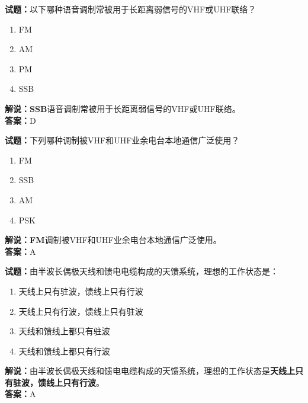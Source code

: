\documentclass{ctexbook}
\begin{document}
\vspace{\baselineskip}

\noindent\textbf{试题：}以下哪种语音调制常被用于长距离弱信号的VHF或UHF联络？

\begin{enumerate}[leftmargin=3em]
  \item FM
  \item AM
  \item PM
  \item SSB
\end{enumerate}

\noindent\textbf{解说：}\textbf{SSB}语音调制常被用于长距离弱信号的VHF或UHF联络。\\\noindent\textbf{答案：}D

\vspace{\baselineskip}

\noindent\textbf{试题：}下列哪种调制被VHF和UHF业余电台本地通信广泛使用？

\begin{enumerate}[leftmargin=3em]
  \item FM
  \item SSB
  \item AM
  \item PSK
\end{enumerate}

\noindent\textbf{解说：}\textbf{FM}调制被VHF和UHF业余电台本地通信广泛使用。\\\noindent\textbf{答案：}A

\vspace{\baselineskip}

\noindent\textbf{试题：}由半波长偶极天线和馈电电缆构成的天馈系统，理想的工作状态是：

\begin{enumerate}[leftmargin=3em]
  \item 天线上只有驻波，馈线上只有行波
  \item 天线上只有行波，馈线上只有驻波
  \item 天线和馈线上都只有驻波
  \item 天线和馈线上都只有行波
\end{enumerate}

\noindent\textbf{解说：}由半波长偶极天线和馈电电缆构成的天馈系统，理想的工作状态是\textbf{天线上只有驻波，馈线上只有行波}。\\\noindent\textbf{答案：}A%

\vspace{\baselineskip}
\end{document}
